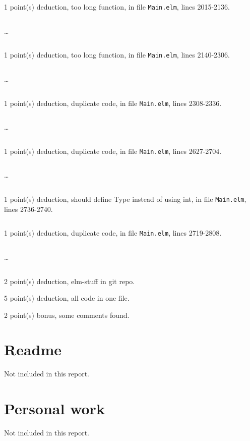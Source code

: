 \documentclass{article}
\begin{document}
1 point(s) {\color{red}deduction}, too long function, in file {\color{blue}\texttt{Main.elm}}, lines {\color{blue}2015-2136}.

\inputminted[firstline=2015,lastline=2024]{elm}{Main.elm}

\dots

\inputminted[firstline=2127,lastline=2136]{elm}{Main.elm}

1 point(s) {\color{red}deduction}, too long function, in file {\color{blue}\texttt{Main.elm}}, lines {\color{blue}2140-2306}.

\inputminted[firstline=2140,lastline=2149]{elm}{Main.elm}

\dots

\inputminted[firstline=2297,lastline=2306]{elm}{Main.elm}

1 point(s) {\color{red}deduction}, duplicate code, in file {\color{blue}\texttt{Main.elm}}, lines {\color{blue}2308-2336}.

\inputminted[firstline=2308,lastline=2317]{elm}{Main.elm}

\dots

\inputminted[firstline=2327,lastline=2336]{elm}{Main.elm}

1 point(s) {\color{red}deduction}, duplicate code, in file {\color{blue}\texttt{Main.elm}}, lines {\color{blue}2627-2704}.

\inputminted[firstline=2627,lastline=2636]{elm}{Main.elm}

\dots

\inputminted[firstline=2695,lastline=2704]{elm}{Main.elm}

1 point(s) {\color{red}deduction}, should define Type instead of using int, in file {\color{blue}\texttt{Main.elm}}, lines {\color{blue}2736-2740}.

\inputminted[firstline=2736,lastline=2740]{elm}{Main.elm}

1 point(s) {\color{red}deduction}, duplicate code, in file {\color{blue}\texttt{Main.elm}}, lines {\color{blue}2719-2808}.

\inputminted[firstline=2719,lastline=2728]{elm}{Main.elm}

\dots

\inputminted[firstline=2799,lastline=2808]{elm}{Main.elm}

2 point(s) {\color{red}deduction}, elm-stuff in git repo.\medskip

5 point(s) {\color{red}deduction}, all code in one file.\medskip

2 point(s) {\color{red}bonus}, some comments found.\medskip



\newpage

\section{Readme}

Not included in this report.

\section{Personal work}

Not included in this report.


\newpage
\end{document}
